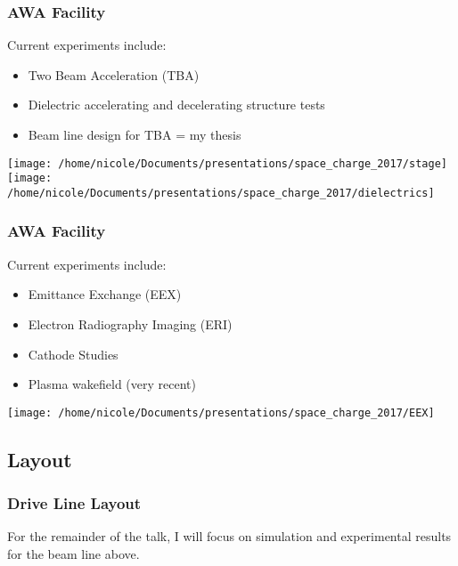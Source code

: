 \documentclass[professionalfonts,t]{beamer}
\begin{document}
\begin{frame}
\frametitle{AWA Facility}
Current experiments include:
\begin{itemize}
	\item{Two Beam Acceleration (TBA)}
	\item{Dielectric accelerating and decelerating structure tests}
	\item{Beam line design for TBA = my thesis}
\end{itemize}
\vspace{0.5cm}
\texttt{[image: /home/nicole/Documents/presentations/space\_charge\_2017/stage]}\hfill\texttt{[image: /home/nicole/Documents/presentations/space\_charge\_2017/dielectrics]}

\end{frame}

\begin{frame}
\frametitle{AWA Facility}
Current experiments include:
\begin{itemize}
\item{Emittance Exchange (EEX)}
\item{Electron Radiography Imaging (ERI)}
\item{Cathode Studies}
\item Plasma wakefield (very recent)
\end{itemize}
\vspace{0.3cm}
\centering
\texttt{[image: /home/nicole/Documents/presentations/space\_charge\_2017/EEX]}
\end{frame}


\subsection{Layout}
\begin{frame}
	\frametitle{Drive Line Layout}
	\begin{tikzpicture}[scale=\textwidth/20cm, text=black]
	
	\end{tikzpicture}
	
	\vspace{3em}
	For the remainder of the talk, I will focus on simulation and experimental results for the beam line above.
\end{frame}
\end{document}
